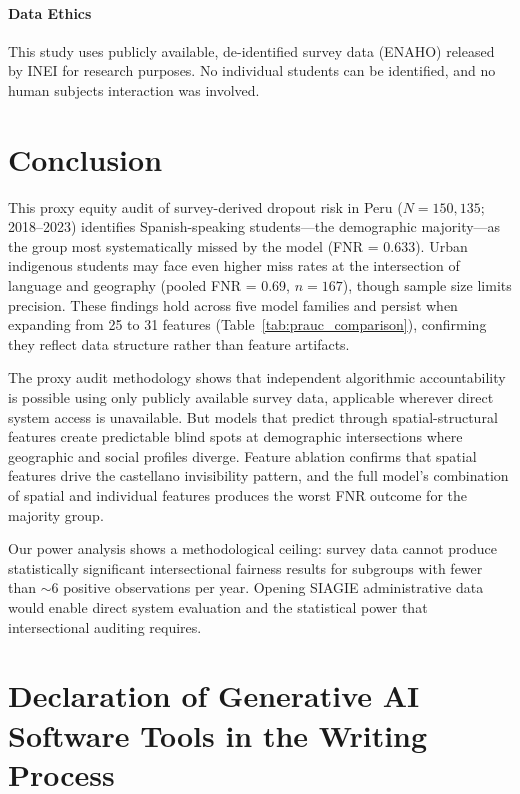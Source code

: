 \documentclass[notitlepage,12pt]{jedm}
\begin{document}
\paragraph{Data Ethics} This study uses publicly available, de-identified survey data (ENAHO) released by INEI for research purposes. No individual students can be identified, and no human subjects interaction was involved.

\section{Conclusion}

This proxy equity audit of survey-derived dropout risk in Peru ($N=150{,}135$; 2018--2023) identifies Spanish-speaking students---the demographic majority---as the group most systematically missed by the model (FNR = 0.633). Urban indigenous students may face even higher miss rates at the intersection of language and geography (pooled FNR = 0.69, $n=167$), though sample size limits precision. These findings hold across five model families and persist when expanding from 25 to 31 features (Table~\ref{tab:prauc_comparison}), confirming they reflect data structure rather than feature artifacts.

The proxy audit methodology shows that independent algorithmic accountability is possible using only publicly available survey data, applicable wherever direct system access is unavailable. But models that predict through spatial-structural features create predictable blind spots at demographic intersections where geographic and social profiles diverge. Feature ablation confirms that spatial features drive the castellano invisibility pattern, and the full model's combination of spatial and individual features produces the worst FNR outcome for the majority group.

Our power analysis shows a methodological ceiling: survey data cannot produce statistically significant intersectional fairness results for subgroups with fewer than $\sim$6 positive observations per year. Opening SIAGIE administrative data would enable direct system evaluation and the statistical power that intersectional auditing requires.

\section*{Declaration of Generative AI Software Tools in the Writing Process}
\end{document}
